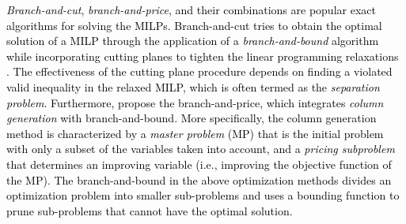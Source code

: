 \documentclass[11pt]{article}
\newcommand\add[1]{\textcolor{black}{#1}}
\begin{document}
\add{\textit{Branch-and-cut}, \textit{branch-and-price}, and their combinations are popular exact algorithms for solving the MILPs. Branch-and-cut tries to obtain the optimal solution of a MILP through the application of a \textit{branch-and-bound}  algorithm while incorporating cutting planes to tighten the linear programming relaxations \citep{padberg1991branch}.  The effectiveness of the cutting plane procedure depends on finding a violated valid inequality in the relaxed MILP, which is often termed as the \textit{separation problem}.  Furthermore, \cite{barnhart1998branch} propose the branch-and-price, which integrates \textit{column generation} with branch-and-bound.  More specifically, the column generation method is characterized by a \textit{master problem} (MP) that is the initial problem with only a subset of the variables taken into account, and a \textit{pricing subproblem} that determines an improving variable (i.e., improving the objective function of the MP).  The branch-and-bound in the above optimization methods divides an optimization problem into smaller sub-problems and uses a bounding function to prune sub-problems that cannot have the optimal solution.}
\newline


\end{document}
